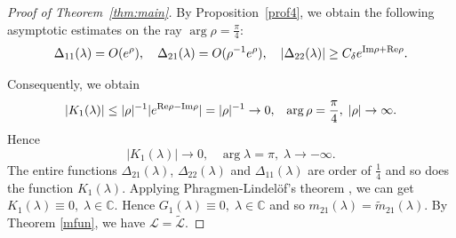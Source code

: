 \documentclass[reqno,12pt,centertags]{amsart}
\renewcommand{\Re}{\text{\rm Re}}
\renewcommand{\Im}{\text{\rm Im}}
\numberwithin{equation}{section}
\theoremstyle{definition}
\begin{document}
\begin{proof}[Proof of Theorem~\ref{thm:main}]
	By Proposition~\ref{prof4}, we obtain the following asymptotic estimates  on the ray $\arg\rho=\frac{\pi}{4}$:
	\begin{equation*}
		{\Delta}_{11}(\lambda)=O(e^\rho),\quad
		{\Delta}_{21}(\lambda)=O(\rho^{-1}e^\rho),\quad
		|{\Delta}_{22}(\lambda)|\geq C_{\delta}e^{\Im \rho+\Re \rho}.
	\end{equation*}
	
	Consequently, we obtain
	\begin{equation*}
		|K_{1}(\lambda)|\leq|\rho|^{-1}|e^{\Re\rho-\Im\rho}|=|\rho|^{-1}\rightarrow 0,\;\;\;\arg\rho=\frac{\pi}{4},\;|\rho|\rightarrow\infty.
	\end{equation*}
	Hence
	\begin{equation*}
		|K_{1}(\lambda)|\rightarrow 0,\;\;\;\arg\lambda=\pi,\;\lambda\rightarrow-\infty.
	\end{equation*}
	The entire functions ${\Delta}_{21}(\lambda)$, ${\Delta}_{22}(\lambda)$ and ${\Delta}_{11}(\lambda)$ are order of $\frac{1}{4}$ and so does the function $K_{1}(\lambda)$. Applying Phragmen-Lindel\"of's theorem \cite{BFY},  we can get $K_{1}(\lambda) \equiv 0,\;\lambda\in \mathbb{C}$. Hence $G_1(\lambda) \equiv 0,\;\lambda\in \mathbb{C}$ and so $m_{21}(\lambda)=\tilde{m}_{21}(\lambda)$.
	By Theorem \ref{mfun},  we have $\mathcal{L}=\tilde{\mathcal{L}}.$	
\end{proof}
\end{document}
